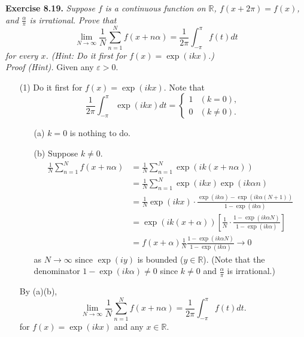 \documentclass{article}
\begin{document}



\textbf{Exercise 8.19.}
\emph{Suppose $f$ is a continuous function on $\mathbb{R}$,
$f(x+2\pi) = f(x)$, and $\frac{\alpha}{\pi}$ is irrational.
Prove that
\[
  \lim_{N \to \infty} \frac{1}{N} \sum_{n=1}^{N} f(x+n\alpha)
  = \frac{1}{2\pi} \int_{-\pi}^{\pi} f(t) dt
\]
for every $x$.
(Hint: Do it first for $f(x) = \exp(ikx)$.)}\\

\emph{Proof (Hint).}
Given any $\varepsilon > 0$.
\begin{enumerate}
\item[(1)]
Do it first for $f(x) = \exp(ikx)$.
Note that
\begin{equation*}
  \frac{1}{2\pi} \int_{-\pi}^{\pi}\exp(ikx)dt =
    \begin{cases}
      1 & (k = 0), \\
      0 & (k \neq 0).
    \end{cases}
\end{equation*}
  \begin{enumerate}
  \item[(a)]
    $k = 0$ is nothing to do.
  \item[(b)]
    Suppose $k \neq 0$.
    \begin{align*}
      \frac{1}{N} \sum_{n=1}^{N} f(x+n\alpha)
      &= \frac{1}{N} \sum_{n=1}^{N} \exp(ik(x+n\alpha)) \\
      &= \frac{1}{N} \sum_{n=1}^{N} \exp(ikx) \exp(ik\alpha n) \\
      &= \frac{1}{N} \exp(ikx) \cdot
        \frac{\exp(ik\alpha) - \exp(ik\alpha(N+1))}{1 - \exp(ik\alpha)} \\
      &= \exp(ik(x+\alpha)) \left[
        \frac{1}{N} \cdot \frac{1 - \exp(ik\alpha N)}{1 - \exp(ik\alpha)}
        \right] \\
      &= f(x+\alpha) \frac{1}{N} \frac{1 - \exp(ik\alpha N)}{1 - \exp(ik\alpha)} \to 0
    \end{align*}
    as $N \to \infty$ since $\exp(iy)$ is bounded ($y \in \mathbb{R}$).
    (Note that the denominator
    $1-\exp(ik\alpha) \neq 0$ since $k \neq 0$ and $\frac{\alpha}{\pi}$ is irrational.)
  \end{enumerate}
  By (a)(b),
  \[
    \lim_{N \to \infty} \frac{1}{N} \sum_{n=1}^{N} f(x+n\alpha)
    = \frac{1}{2\pi} \int_{-\pi}^{\pi} f(t) dt.
  \]
  for $f(x) = \exp(ikx)$ and any $x \in \mathbb{R}$.


\end{enumerate}
\end{document}
